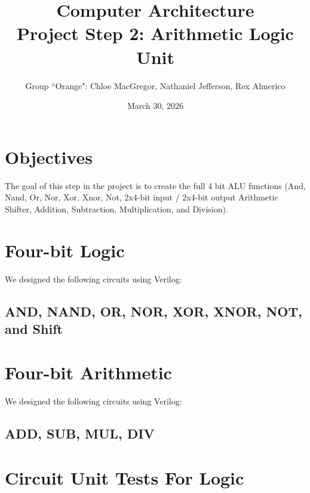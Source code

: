 \documentclass[11pt]{article}
\title{\textbf{Computer Architecture}\\[0.5em]
    \large Project Step 2: Arithmetic Logic Unit}
\author{Group ``Orange": Chloe MacGregor, Nathaniel Jefferson, Rex Almerico}
\date{March 30, 2026}
\begin{document}
\maketitle
\thispagestyle{empty}

\section{Objectives}
The goal of this step in the project is to create the full 4 bit ALU functions (And, Nand, Or, Nor, Xor, Xnor, Not, 2x4-bit input / 2x4-bit output Arithmetic Shifter, Addition, Subtraction, Multiplication, and Division).

\section{Four-bit Logic}
We designed the following circuits using Verilog:
\subsection{AND, NAND, OR, NOR, XOR, XNOR, NOT, and Shift}


\pagebreak







\section{Four-bit Arithmetic}
We designed the following circuits using Verilog:
\subsection{ADD, SUB, MUL, DIV}


\pagebreak



\pagebreak

\section{Circuit Unit Tests For Logic}

\end{document}
